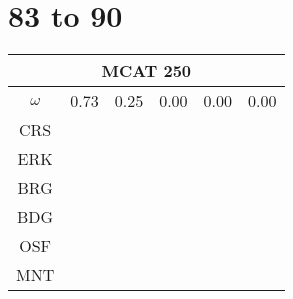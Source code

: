 \documentclass[a4paper,12pt]{article}
\begin{document}
\section*{83 to 90}
\begin{tabular}{|c|c|c|c|c|c|}%
         \hline \multicolumn{6}{|c|}{MCAT 250} \\ \hline
         $\omega$&0.73&0.25&0.00&0.00&0.00\\ \hline %
        CRS&\cellcolor[HTML]{E41A1C}&\cellcolor[HTML]{E41A1C}&\cellcolor[HTML]{E41A1C}&\cellcolor[HTML]{E41A1C}&\cellcolor[HTML]{E41A1C}\\ \hline %
        ERK&\cellcolor[HTML]{377EB8}&\cellcolor[HTML]{E41A1C}&\cellcolor[HTML]{E41A1C}&\cellcolor[HTML]{377EB8}&\cellcolor[HTML]{E41A1C}\\ \hline %
        BRG&\cellcolor[HTML]{377EB8}&\cellcolor[HTML]{E41A1C}&\cellcolor[HTML]{E41A1C}&\cellcolor[HTML]{377EB8}&\cellcolor[HTML]{E41A1C}\\ \hline %
        BDG&\cellcolor[HTML]{4DAF4A}&\cellcolor[HTML]{377EB8}&\cellcolor[HTML]{377EB8}&\cellcolor[HTML]{377EB8}&\cellcolor[HTML]{377EB8}\\ \hline %
        OSF&\cellcolor[HTML]{4DAF4A}&\cellcolor[HTML]{377EB8}&\cellcolor[HTML]{377EB8}&\cellcolor[HTML]{4DAF4A}&\cellcolor[HTML]{377EB8}\\ \hline %
        MNT&\cellcolor[HTML]{4DAF4A}&\cellcolor[HTML]{377EB8}&\cellcolor[HTML]{377EB8}&\cellcolor[HTML]{4DAF4A}&\cellcolor[HTML]{4DAF4A}\\ \hline %

\end{tabular}
\end{document}
